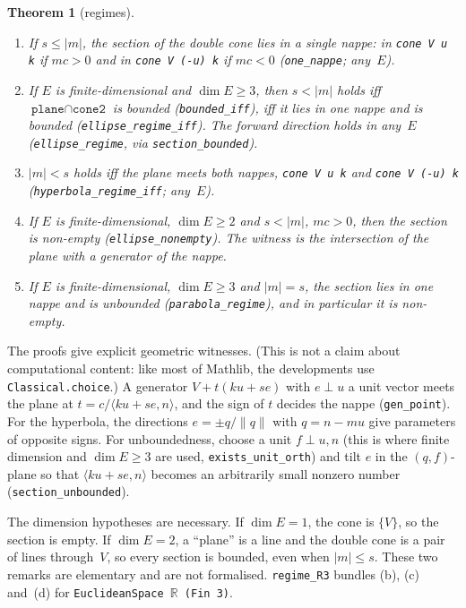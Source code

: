 \documentclass[11pt]{article}
\newtheorem{theorem}{Theorem}
\theoremstyle{remark}
\newcommand{\lean}[1]{\texttt{#1}}
\newcommand{\ip}[2]{\langle #1,#2\rangle}
\newcommand{\nm}[1]{\lVert #1\rVert}
\newcommand{\R}{\mathbb{R}}
\begin{document}
\begin{theorem}[regimes]\label{thm:regime}
\leavevmode
\begin{enumerate}
\item[(a)] If $s\le|m|$, the section of the double cone lies in a single nappe: in
\lean{cone V u k} if $mc>0$ and in \lean{cone V (-u) k} if $mc<0$ (\lean{one\_nappe}; any~$E$).
\item[(b)] If $E$ is finite-dimensional and $\dim E\ge3$, then $s<|m|$ holds iff $\lean{plane}\cap\lean{cone2}$ is bounded
(\lean{bounded\_iff}), iff it lies in one nappe and is bounded (\lean{ellipse\_regime\_iff}).
The forward direction holds in any~$E$ (\lean{ellipse\_regime}, via \lean{section\_bounded}).
\item[(c)] $|m|<s$ holds iff the plane meets both nappes, \lean{cone V u k} and
\lean{cone V (-u) k} (\lean{hyperbola\_regime\_iff}; any~$E$).
\item[(d)] If $E$ is finite-dimensional, $\dim E\ge2$ and $s<|m|$, $mc>0$, then the section is non-empty (\lean{ellipse\_nonempty}). The witness is
the intersection of the plane with a generator of the nappe.
\item[(e)] If $E$ is finite-dimensional, $\dim E\ge3$ and $|m|=s$, the section lies in one nappe and is unbounded
(\lean{parabola\_regime}), and in particular it is non-empty.
\end{enumerate}
\end{theorem}

The proofs give explicit geometric witnesses. (This is not a claim about computational content:
like most of Mathlib, the developments use \lean{Classical.choice}.) A generator $V+t(ku+se)$ with $e\perp u$ a unit vector meets the plane at
$t=c/\ip{ku+se}n$, and the sign of $t$ decides the nappe (\lean{gen\_point}). For the
hyperbola, the directions $e=\pm q/\nm q$ with $q=n-mu$ give parameters of opposite signs. For
unboundedness, choose a unit $f\perp u,n$ (this is where finite dimension and $\dim E\ge3$ are used,
\lean{exists\_unit\_orth}) and tilt $e$ in the $(q,f)$-plane so that $\ip{ku+se}n$ becomes an
arbitrarily small nonzero number (\lean{section\_unbounded}).

The dimension hypotheses are necessary. If $\dim E=1$, the cone is $\{V\}$, so the section is
empty. If $\dim E=2$, a ``plane'' is a line and the double cone is a pair of lines through~$V$, so
every section is bounded, even when $|m|\le s$. These two remarks are elementary and are not
formalised. \lean{regime\_R3} bundles (b), (c) and~(d) for \lean{EuclideanSpace $\R$ (Fin 3)}.
\end{document}
